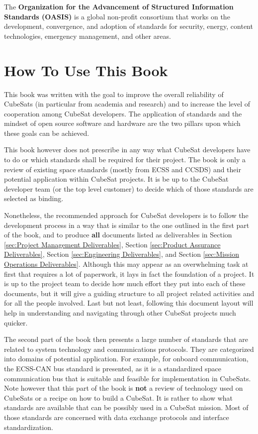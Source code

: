 The \textbf{Organization for the Advancement of Structured Information Standards (OASIS)} \cite{oasis.org} is a global non-profit consortium that works on the development, convergence, and adoption of standards for security, energy, content technologies, emergency management, and other areas.

\section{How To Use This Book}

This book was written with the goal to improve the overall reliability of CubeSats (in particular from academia and research) and to increase the level of cooperation among CubeSat developers. The application of standards and the mindset of open source software and hardware are the two pillars upon which these goals can be achieved.

This book however does not prescribe in any way what CubeSat developers have to do or which standards shall be required for their project. The book is only a review of existing space standards (mostly from ECSS and CCSDS) and their potential application within CubeSat projects. It is be up to the CubeSat developer team (or the top level customer) to decide which of those standards are selected as binding.

Nonetheless, the recommended approach for CubeSat developers is to follow the development process in a way that is similar to the one outlined in the first part of the book, and to produce \textbf{all} documents listed as deliverables in Section \ref{sec:Project Management Deliverables}, Section \ref{sec:Product Assurance Deliverables}, Section \ref{sec:Engineering Deliverables}, and Section \ref{sec:Mission Operations Deliverables}. Although this may appear as an overwhelming task at first that requires a lot of paperwork, it lays in fact the foundation of a project. It is up to the project team to decide how much effort they put into each of these documents, but it will give a guiding structure to all project related activities and for all the people involved. Last but not least, following this document layout will help in understanding and navigating through other CubeSat projects much quicker.

The second part of the book then presents a large number of standards that are related to system technology and communications protocols. They are categorized into domains of potential application. For example, for onboard communication, the ECSS-CAN bus standard is presented, as it is a standardized space communication bus that is suitable and feasible for implementation in CubeSats. Note however that this part of the book is \textbf{not} a review of technology used on CubeSats or a recipe on how to build a CubeSat. It is rather to show what standards are available that can be possibly used in a CubeSat mission. Most of those standards are concerned with data exchange protocols and interface standardization.